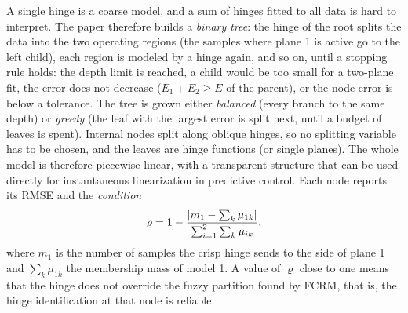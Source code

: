 A single hinge is a coarse model, and a sum of hinges fitted to all data is hard to interpret. The paper therefore builds a \emph{binary tree}: the hinge of the root splits the data into the two operating regions (the samples where plane 1 is active go to the left child), each region is modeled by a hinge again, and so on, until a stopping rule holds: the depth limit is reached, a child would be too small for a two-plane fit, the error does not decrease ($E_1+E_2\ge E$ of the parent), or the node error is below a tolerance. The tree is grown either \emph{balanced} (every branch to the same depth) or \emph{greedy} (the leaf with the largest error is split next, until a budget of leaves is spent). Internal nodes split along oblique hinges, so no splitting variable has to be chosen, and the leaves are hinge functions (or single planes). The whole model is therefore piecewise linear, with a transparent structure that can be used directly for instantaneous linearization in predictive control. Each node reports its RMSE and the \emph{condition}
\begin{equation}
  \varrho=1-\frac{\left\lvert m_1-\sum_{k}\mu_{1k} \right\rvert}{\sum_{i=1}^{2}\sum_k\mu_{ik}},
  \label{eq:models:condition}
\end{equation}
where $m_1$ is the number of samples the crisp hinge sends to the side of plane 1 and $\sum_k\mu_{1k}$ the membership mass of model 1. A value of $\varrho$ close to one means that the hinge does not override the fuzzy partition found by FCRM, that is, the hinge identification at that node is reliable.

